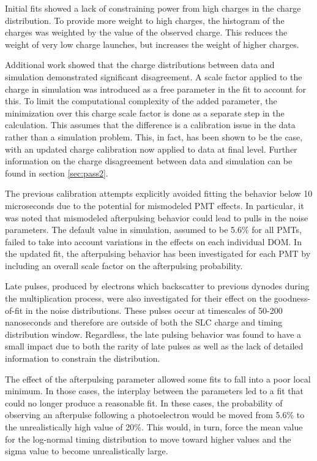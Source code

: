 Initial fits showed a lack of constraining power from high charges in the charge distribution.
To provide more weight to high charges, the histogram of the charges was weighted by the value of the observed charge.
This reduces the weight of very low charge launches, but increases the weight of higher charges.

Additional work showed that the charge distributions between data and simulation demonstrated significant disagreement. 
A scale factor applied to the charge in simulation was introduced as a free parameter in the fit to account for this. 
To limit the computational complexity of the added parameter, the minimization over this charge scale factor is done as a separate step in the calculation.
This assumes that the difference is a calibration issue in the data rather than a simulation problem.
This, in fact, has been shown to be the case, with an updated charge calibration now applied to data at final level.
Further information on the charge disagreement between data and simulation can be found in section \ref{sec:pass2}.

The previous calibration attempts explicitly avoided fitting the behavior below 10 microseconds due to the potential for mismodeled PMT effects.
In particular, it was noted that mismodeled afterpulsing behavior could lead to pulls in the noise parameters.
The default value in simulation, assumed to be 5.6\% for all PMTs, failed to take into account variations in the effects on each individual DOM.
In the updated fit, the afterpulsing behavior has been investigated for each PMT by including an overall scale factor on the afterpulsing probability.

Late pulses, produced by electrons which backscatter to previous dynodes during the multiplication process, were also investigated for their effect on the goodness-of-fit in the noise distributions.
These pulses occur at timescales of 50-200 nanoseconds and therefore are outside of both the SLC charge and timing distribution window.
Regardless, the late pulsing behavior was found to have a small impact due to both the rarity of late pulses as well as the lack of detailed  information to constrain the distribution.

The effect of the afterpulsing parameter allowed some fits to fall into a poor local minimum. 
In those cases, the interplay between the parameters led to a fit that could no longer produce a reasonable fit.
In these cases, the probability of observing an afterpulse following a photoelectron would be moved from 5.6\% to the unrealistically high value of 20\%. 
This would, in turn, force the mean value for the log-normal timing distribution to move toward higher values and the sigma value to become unrealistically large.

